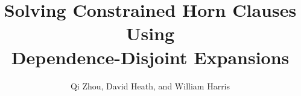 \title{
  Solving Constrained Horn Clauses Using \\
  Dependence-Disjoint Expansions}

\author{Qi Zhou, David Heath, and William Harris}

\newcommand{\titlerunning}{%
  Solving Constrained Horn Clauses Using
  Dependence-Disjoint Expansions
}

\newcommand{\authorrunning}{%
  Qi Zhou, David Heath, and William Harris
}
